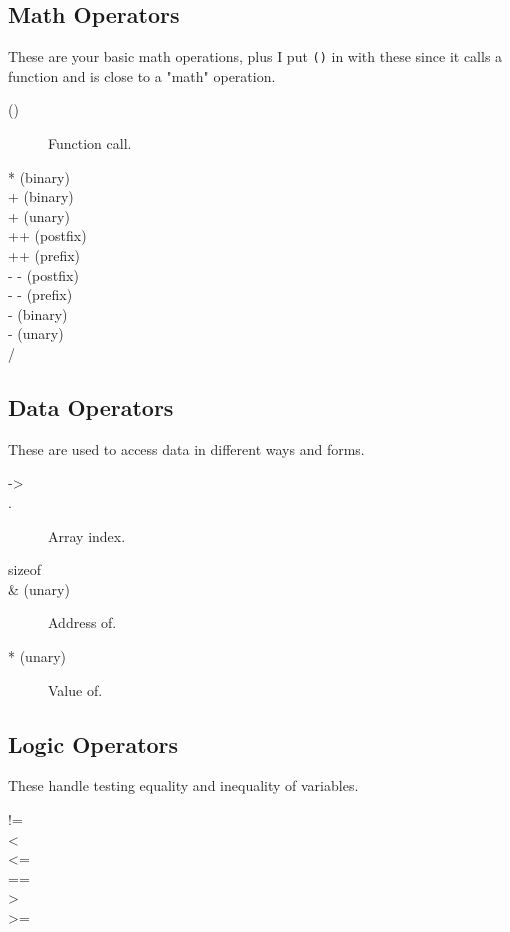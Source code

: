 \subsection{Math Operators}

These are your basic math operations, plus I put \verb|()| in
with these since it calls a function and is close to a "math"
operation.

\begin{description}
\item[()] Function call.
\item[* (binary)]
\item[+ (binary)]
\item[+ (unary)]
\item[++ (postfix)]
\item[++ (prefix)]
\item[- - (postfix)]
\item[- - (prefix)]
\item[- (binary)]
\item[- (unary)]
\item[/]
\end{description}

\subsection{Data Operators}

These are used to access data in different ways and forms.

\begin{description}
\item[->]
\item[.]
\item[\[\]] Array index.
\item[sizeof]
\item[\& (unary)] Address of.
\item[* (unary)] Value of.
\end{description}

\subsection{Logic Operators}

These handle testing equality and inequality of variables.

\begin{description}
\item[!=]
\item[<]
\item[<=]
\item[==]
\item[>]
\item[>=]
\end{description}

